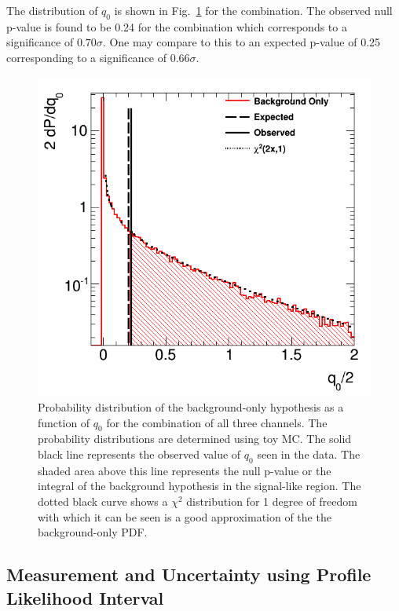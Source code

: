 The distribution of $q_0$ is 
shown in Fig.~\ref{fig:stat_measurement_significance} for the combination.  
The observed null p-value 
is found to be 0.24 for the combination which corresponds to a significance
of $0.70 \sigma$.  One may compare to this to an expected 
p-value of 0.25 corresponding to 
a significance of $0.66 \sigma$.

\begin{figure}[ht!]
\centering
\includegraphics[width=0.80\columnwidth]{figures/statistics/significance/combination.png}
\caption{Probability distribution of the background-only hypothesis as a function of $q_0$ for 
the combination of all three channels. The probability distributions are determined 
using toy MC. The solid black line represents the observed 
value of $q_0$ seen in the data. The shaded area above
this line represents the null p-value or the 
integral of the background hypothesis in the signal-like region.
The dotted black curve shows a $\chi^2$ distribution for 1 degree of 
freedom with which 
it can be seen is a good approximation of the 
the background-only PDF.}
\label{fig:stat_measurement_significance}
\end{figure}


\subsection{Measurement and Uncertainty using Profile Likelihood Interval}

